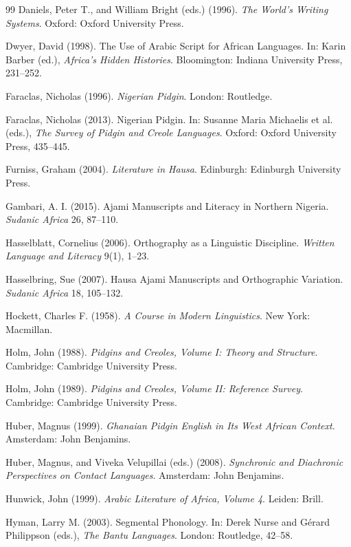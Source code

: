 \documentclass[12pt]{article}
\begin{document}
\begin{thebibliography}{99}
Daniels, Peter T., and William Bright (eds.) (1996).
\textit{The World's Writing Systems}.
Oxford: Oxford University Press.

Dwyer, David (1998).
The Use of Arabic Script for African Languages.
In: Karin Barber (ed.),
\textit{Africa's Hidden Histories}.
Bloomington: Indiana University Press, 231--252.

Faraclas, Nicholas (1996).
\textit{Nigerian Pidgin}.
London: Routledge.

Faraclas, Nicholas (2013).
Nigerian Pidgin.
In: Susanne Maria Michaelis et al. (eds.),
\textit{The Survey of Pidgin and Creole Languages}.
Oxford: Oxford University Press, 435--445.

Furniss, Graham (2004).
\textit{Literature in Hausa}.
Edinburgh: Edinburgh University Press.

Gambari, A. I. (2015).
Ajami Manuscripts and Literacy in Northern Nigeria.
\textit{Sudanic Africa} 26, 87--110.

Hasselblatt, Cornelius (2006).
Orthography as a Linguistic Discipline.
\textit{Written Language and Literacy} 9(1), 1--23.

Hasselbring, Sue (2007).
Hausa Ajami Manuscripts and Orthographic Variation.
\textit{Sudanic Africa} 18, 105--132.

Hockett, Charles F. (1958).
\textit{A Course in Modern Linguistics}.
New York: Macmillan.

Holm, John (1988).
\textit{Pidgins and Creoles, Volume I: Theory and Structure}.
Cambridge: Cambridge University Press.

Holm, John (1989).
\textit{Pidgins and Creoles, Volume II: Reference Survey}.
Cambridge: Cambridge University Press.

Huber, Magnus (1999).
\textit{Ghanaian Pidgin English in Its West African Context}.
Amsterdam: John Benjamins.

Huber, Magnus, and Viveka Velupillai (eds.) (2008).
\textit{Synchronic and Diachronic Perspectives on Contact Languages}.
Amsterdam: John Benjamins.

Hunwick, John (1999).
\textit{Arabic Literature of Africa, Volume 4}.
Leiden: Brill.

Hyman, Larry M. (2003).
Segmental Phonology.
In: Derek Nurse and Gérard Philippson (eds.),
\textit{The Bantu Languages}.
London: Routledge, 42--58.


\end{thebibliography}
\end{document}
